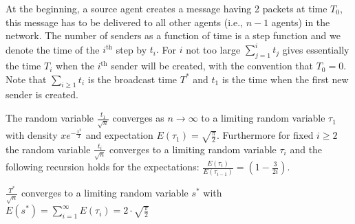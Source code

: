 At the beginning, a source agent creates a message having 2 packets at time $%
T_{0}$, this message has to be delivered to all other agents (i.e., $n-1$
agents) in the network. The number of senders as a function of time is a
step function and we denote the time of the $i^\textrm{th}$ step by $t_{i}.$
For $i$ not too large $\sum\limits_{j=1}^{i}t_{j}$ gives essentially the
time $T_{i}$ when the $i^\textrm{th}$ sender will be created, with the
convention that $T_{0}=0$. Note that $\sum\limits_{i\geq 1}t_{i}$ is the
broadcast time $T^{\ast }$ and $t_{1}$ is the time when the first new sender
is created. \vspace{-2mm} 
\begin{theorem}
The random variable $\frac{t_{1}}{\sqrt{n}}$ converges as $n\rightarrow \infty $ to a
limiting random variable $\tau _{1}$ with density $xe^{-\frac{x^{2}}{2}}$ and
expectation $E\left( \tau _{1}\right) =\sqrt{\frac{\pi }{2}}.$ Furthermore
for fixed $i\geq 2$ the random variable $\frac{t_{i}}{\sqrt{n}}$ converges to a
limiting random variable $\tau _{i}$ and the following recursion holds for the
expectations: $\frac{E\left( \tau _{i}\right) }{E\left( \tau _{i-1}\right) }%
=\left( 1-\frac{3}{2i}\right) .$
\end{theorem}
\vspace{-2mm} 
\begin{theorem}
$\frac{T^{\ast }}{\sqrt{n}}$ converges to a limiting random variable $s^{\ast }$ with $%
E\left( s^{\ast }\right) =\sum\limits_{i=1}^{\infty }E\left( \tau
_{i}\right) =2\cdot \sqrt{\frac{\pi }{2}}$
\end{theorem}
\vspace{-3mm} 

